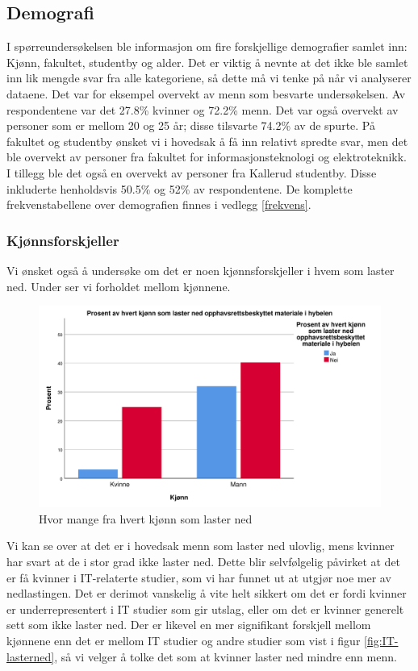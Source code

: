 \subsection{Demografi}
I spørreundersøkelsen ble informasjon om fire forskjellige demografier samlet inn: Kjønn, fakultet, studentby og alder. Det er viktig å nevnte at det ikke ble samlet inn lik mengde svar fra alle kategoriene, så dette må vi tenke på når vi analyserer dataene. Det var for eksempel overvekt av menn som besvarte undersøkelsen. Av respondentene var det 27.8\% kvinner og 72.2\% menn. Det var også overvekt av personer som er mellom 20 og 25 år; disse tilsvarte 74.2\% av de spurte. På fakultet og studentby ønsket vi i hovedsak å få inn relativt spredte svar, men det ble overvekt av personer fra fakultet for informasjonsteknologi og elektroteknikk. I tillegg ble det også en overvekt av personer fra Kallerud studentby. Disse inkluderte henholdsvis 50.5\% og 52\% av respondentene. De komplette frekvenstabellene over demografien finnes i vedlegg \ref{frekvens}. 

\subsubsection{Kjønnsforskjeller}
Vi ønsket også å undersøke om det er noen kjønnsforskjeller i hvem som laster ned. Under ser vi forholdet mellom kjønnene.
\begin{figure}[H]
    \centering
    \includegraphics[scale=0.45]{case_1/bilder/kjonn_lasterned.pdf}
    \caption[Kjønn laster ned]{Hvor mange fra hvert kjønn som laster ned}
    \label{fig:case1-kjonn_lasterned}
\end{figure}
Vi kan se over at det er i hovedsak menn som laster ned ulovlig, mens kvinner har svart at de i stor grad ikke laster ned. Dette blir selvfølgelig påvirket at det er få kvinner i IT-relaterte studier, som vi har funnet ut at utgjør noe mer av nedlastingen. Det er derimot vanskelig å vite helt sikkert om det er fordi kvinner er underrepresentert i IT studier som gir utslag, eller om det er kvinner generelt sett som ikke laster ned. Der er likevel en mer signifikant forskjell mellom kjønnene enn det er mellom IT studier og andre studier som vist i figur \ref{fig:IT-lasterned}, så vi velger å tolke det som at kvinner laster ned mindre enn menn.


